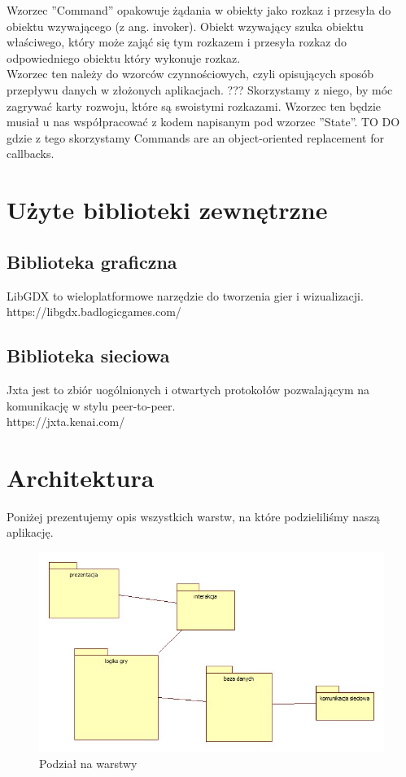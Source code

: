 \documentclass[a4paper, 11pt]{article}
\begin{document}
	Wzorzec ''Command'' opakowuje żądania w obiekty jako rozkaz i przesyła do obiektu wzywającego (z ang. invoker). Obiekt wzywający szuka obiektu właściwego, który może zająć się tym rozkazem i   przesyła rozkaz do odpowiedniego obiektu który wykonuje rozkaz.\\  
	Wzorzec ten należy do wzorców czynnościowych, czyli opisujących sposób przepływu danych w złożonych aplikacjach.%
	??? Skorzystamy z niego, by móc zagrywać karty rozwoju, które są swoistymi rozkazami. Wzorzec ten będzie musiał u nas współpracować z kodem napisanym pod wzorzec ''State''. %
	TO DO gdzie z tego skorzystamy
	Commands are an object-oriented replacement for callbacks.\\
	
	
	\section{Użyte biblioteki zewnętrzne}
	\subsection{Biblioteka graficzna}
	LibGDX to wieloplatformowe narzędzie do tworzenia gier i wizualizacji.\\
	 https://libgdx.badlogicgames.com/
	\subsection{Biblioteka sieciowa}
	Jxta jest to zbiór uogólnionych i otwartych protokołów pozwalającym na komunikację w stylu peer-to-peer. \\
	https://jxta.kenai.com/
	\section{Architektura}
	\indent
	
	Poniżej prezentujemy opis wszystkich warstw, na które podzieliliśmy naszą aplikację.
	\begin{figure}[H]%
		\includegraphics[scale=0.5]{uml/main.jpg}\caption{Podział na warstwy}
	\end{figure}
\end{document}
